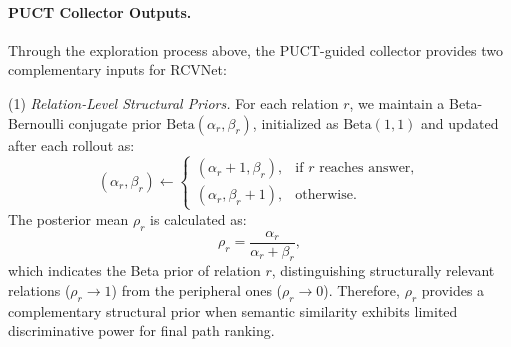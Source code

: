 \documentclass{article}
\theoremstyle{plain}
\theoremstyle{definition}
\theoremstyle{remark}
\begin{document}
\paragraph{PUCT Collector Outputs.} Through the exploration process above, the PUCT-guided collector provides two complementary 
inputs for RCVNet: 

(1) \textit{Relation-Level Structural Priors.} 
For each relation $r$, we maintain a Beta-Bernoulli conjugate prior 
$\text{Beta}(\alpha_r, \beta_r)$, initialized as $\text{Beta}(1, 1)$ and updated after each rollout as:
\begin{equation}
(\alpha_r, \beta_r) \leftarrow 
\begin{cases}
(\alpha_r + 1, \beta_r), & \text{if } r \text{ reaches answer}, \nonumber\\
(\alpha_r, \beta_r + 1), & \text{otherwise}.
\end{cases}
\label{eq:beta_prior}
\end{equation}
The posterior mean $\rho_r$ is calculated as:
\begin{equation}
\label{eq:rho}
\rho_r = \frac{\alpha_r}{\alpha_r + \beta_r},
\end{equation}
which indicates the Beta prior of relation $r$, distinguishing structurally 
relevant relations ($\rho_r \to 1$) from the peripheral ones ($\rho_r \to 0$). 
Therefore, $\rho_r$ provides a complementary structural prior when 
semantic similarity exhibits limited discriminative power for final path 
ranking. 

\end{document}

